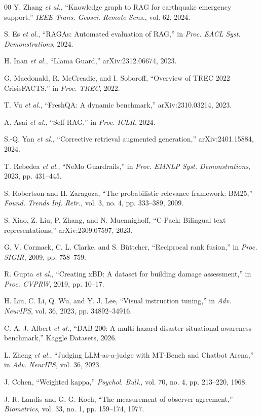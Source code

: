 \documentclass[conference]{IEEEtran}
\begin{document}
\begin{thebibliography}{00}
 Y. Zhang \textit{et al.}, ``Knowledge graph to RAG for earthquake emergency support,'' \textit{IEEE Trans. Geosci. Remote Sens.}, vol. 62, 2024.

 S. Es \textit{et al.}, ``RAGAs: Automated evaluation of RAG,'' in \textit{Proc. EACL Syst. Demonstrations}, 2024.

 H. Inan \textit{et al.}, ``Llama Guard,'' arXiv:2312.06674, 2023.

 G. Macdonald, R. McCreadie, and I. Soboroff, ``Overview of TREC 2022 CrisisFACTS,'' in \textit{Proc. TREC}, 2022.

 T. Vu \textit{et al.}, ``FreshQA: A dynamic benchmark,'' arXiv:2310.03214, 2023.

 A. Asai \textit{et al.}, ``Self-RAG,'' in \textit{Proc. ICLR}, 2024.

 S.-Q. Yan \textit{et al.}, ``Corrective retrieval augmented generation,'' arXiv:2401.15884, 2024.

 T. Rebedea \textit{et al.}, ``NeMo Guardrails,'' in \textit{Proc. EMNLP Syst. Demonstrations}, 2023, pp. 431--445.

 S. Robertson and H. Zaragoza, ``The probabilistic relevance framework: BM25,'' \textit{Found. Trends Inf. Retr.}, vol. 3, no. 4, pp. 333--389, 2009.

 S. Xiao, Z. Liu, P. Zhang, and N. Muennighoff, ``C-Pack: Bilingual text representations,'' arXiv:2309.07597, 2023.

 G. V. Cormack, C. L. Clarke, and S. B\"{u}ttcher, ``Reciprocal rank fusion,'' in \textit{Proc. SIGIR}, 2009, pp. 758--759.

 R. Gupta \textit{et al.}, ``Creating xBD: A dataset for building damage assessment,'' in \textit{Proc. CVPRW}, 2019, pp. 10--17.

 H. Liu, C. Li, Q. Wu, and Y. J. Lee, ``Visual instruction tuning,'' in \textit{Adv. NeurIPS}, vol. 36, 2023, pp. 34892--34916.

 C. A. J. Albert \textit{et al.}, ``DAB-200: A multi-hazard disaster situational awareness benchmark,'' Kaggle Datasets, 2026.

 L. Zheng \textit{et al.}, ``Judging LLM-as-a-judge with MT-Bench and Chatbot Arena,'' in \textit{Adv. NeurIPS}, vol. 36, 2023.

 J. Cohen, ``Weighted kappa,'' \textit{Psychol. Bull.}, vol. 70, no. 4, pp. 213--220, 1968.

 J. R. Landis and G. G. Koch, ``The measurement of observer agreement,'' \textit{Biometrics}, vol. 33, no. 1, pp. 159--174, 1977.

\end{thebibliography}
\end{document}

